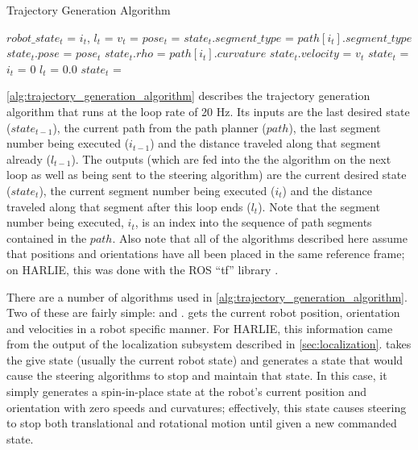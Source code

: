\begin{algorithm}
\caption{Trajectory Generation Algorithm}
\label{alg:trajectory_generation_algorithm}
\DontPrintSemicolon
{}


$robot\_state_t$ = \GetCurrentRobotState{} \;
{
	$i_t$, $l_t$ =  \;
	$v_t$ =  \;
	$pose_t$ =  \;
	$state_t.segment\_type$ = $path\left[i_t\right].segment\_type$ \;
	$state_t.pose$ = $pose_t$ \;
	$state_t.rho$ = $path\left[i_t\right].curvature$ \;
	$state_t.velocity$ = $v_t$ \;
	\;
	{
		$state_t$ =  \;
	}
}
{
	$i_t$ = $0$ \;
	$l_t$ = $0.0$ \;
	$state_t$ =  \;
}
\end{algorithm}

\autoref{alg:trajectory_generation_algorithm} describes the trajectory generation algorithm that runs at the loop rate of 20 Hz. Its inputs are the last desired state ($state_{t-1}$), the current path from the path planner ($path$), the last segment number being executed ($i_{t-1}$) and the distance traveled along that segment already ($l_{t-1}$). The outputs (which are fed into the the algorithm on the next loop as well as being sent to the steering algorithm) are the current desired state ($state_t$), the current segment number being executed ($i_t$) and the distance traveled along that segment after this loop ends ($l_t$). Note that the segment number being executed, $i_t$, is an index into the sequence of path segments contained in the $path$. Also note that all of the algorithms described here assume that positions and orientations have all been placed in the same reference frame; on HARLIE, this was done with the ROS ``tf'' library \autocite{TFWiki}.

There are a number of algorithms used in \autoref{alg:trajectory_generation_algorithm}. Two of these are fairly simple: \GetCurrentRobotState and \MakeHaltState. \GetCurrentRobotState gets the current robot position, orientation and velocities in a robot specific manner. For HARLIE, this information came from the output of the localization subsystem described in \autoref{sec:localization}. \MakeHaltState takes the give state (usually the current robot state) and generates a state that would cause the steering algorithms to stop and maintain that state. In this case, it simply generates a spin-in-place state at the robot's current position and orientation with zero speeds and curvatures; effectively, this state causes steering to stop both translational and rotational motion until given a new commanded state.

